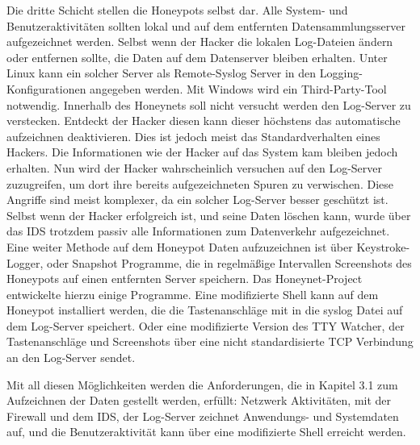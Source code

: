 Die dritte Schicht stellen die Honeypots selbst dar. Alle System- und Benutzeraktivitäten sollten lokal und auf dem entfernten Datensammlungsserver aufgezeichnet werden. Selbst wenn der Hacker die lokalen Log-Dateien ändern oder entfernen sollte, die Daten auf dem Datenserver bleiben erhalten. Unter Linux kann ein solcher Server als Remote-Syslog Server in den Logging-Konfigurationen angegeben werden. Mit Windows wird ein Third-Party-Tool notwendig\cite{spitzner.2002a}. Innerhalb des Honeynets soll nicht versucht werden den Log-Server zu verstecken. Entdeckt der Hacker diesen kann dieser höchstens das automatische aufzeichnen deaktivieren. Dies ist jedoch meist das Standardverhalten eines Hackers\cite{spitzner.2002a}. Die Informationen wie der Hacker auf das System kam bleiben jedoch erhalten. Nun wird der Hacker wahrscheinlich versuchen auf den Log-Server zuzugreifen, um dort ihre bereits aufgezeichneten Spuren zu verwischen. Diese Angriffe sind meist komplexer, da ein solcher Log-Server besser geschützt ist. Selbst wenn der Hacker erfolgreich ist, und seine Daten löschen kann, wurde über das IDS trotzdem passiv alle Informationen zum Datenverkehr aufgezeichnet. 
Eine weiter Methode auf dem Honeypot Daten aufzuzeichnen ist über Keystroke-Logger, oder Snapshot Programme, die in regelmäßige Intervallen Screenshots des Honeypots auf einen entfernten Server speichern. Das Honeynet-Project entwickelte hierzu einige Programme. Eine modifizierte Shell kann auf dem Honeypot installiert werden, die die Tastenanschläge mit in die syslog Datei auf dem Log-Server speichert. Oder eine modifizierte Version des TTY Watcher, der Tastenanschläge und Screenshots über eine nicht standardisierte TCP Verbindung an den Log-Server sendet\cite{spitzner.2002a}\cite{grimes.2003a}.

Mit all diesen Möglichkeiten werden die Anforderungen, die in Kapitel 3.1 zum Aufzeichnen der Daten gestellt werden, erfüllt: Netzwerk Aktivitäten, mit der Firewall und dem IDS, der Log-Server zeichnet Anwendungs- und Systemdaten auf, und die Benutzeraktivität kann über eine modifizierte Shell erreicht werden.\\

